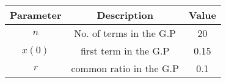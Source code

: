 \renewcommand{\arraystretch}{1.5}
\begin{tabular}{|c|c|c|}
\hline
Parameter & Description & Value \\\hline
\( n \) & No. of terms in the G.P &20 \\\hline
\(x(0) \) & first term in the G.P&0.15 \\\hline
\( r \) & common ratio in the G.P& 0.1 \\\hline
\end{tabular}
